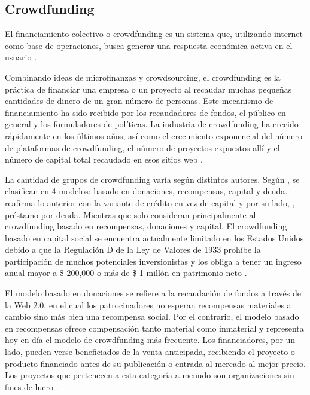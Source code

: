 \subsection{Crowdfunding}
El financiamiento colectivo o crowdfunding es un sistema que, utilizando internet como base de operaciones, busca generar una respuesta económica activa en el usuario \parencite{cr_lopezgolan2017crowdfunding}.

Combinando ideas de microfinanzas y crowdsourcing, el crowdfunding es la práctica de financiar una empresa o un proyecto al recaudar muchas pequeñas cantidades de dinero de un gran número de personas. Este mecanismo de financiamiento ha sido recibido por los recaudadores de fondos, el público en general y los formuladores de políticas. La industria de crowdfunding ha crecido rápidamente en los últimos años, así como el crecimiento exponencial del número de plataformas de crowdfunding, el número de proyectos expuestos allí y el número de capital total recaudado en esos sitios web \parencite{cr_xuefeng2018chcrowdplatf}.

La cantidad de grupos de crowdfunding varía según distintos autores. Según \citeauthor{cr_hollas2013crwd}, se clasifican en 4 modelos: basado en donaciones, recompensas, capital y deuda. \citeauthor{cr_colgren2014risecrwd} reafirma lo anterior con la variante de crédito en vez de capital y por su lado, \citeauthor{cr_collins2014crwd}, préstamo por deuda. Mientras que \citeauthor{cr_lee2018fintech} solo consideran principalmente al crowdfunding basado en recompensas, donaciones y capital. El crowdfunding basado en capital social se encuentra actualmente limitado en los Estados Unidos debido a que la Regulación D de la Ley de Valores de 1933 prohíbe la participación de muchos potenciales inversionistas y los obliga a tener un ingreso anual mayor a \$ 200,000 o más de \$ 1 millón en patrimonio neto \parencite{cr_lichtig2015crowdfunding}.

El modelo basado en donaciones se refiere a la recaudación de fondos a través de la Web 2.0, en el cual los patrocinadores no esperan recompensas materiales a cambio sino más bien una recompensa social. Por el contrario, el modelo basado en recompensas ofrece compensación tanto material como inmaterial y representa hoy en día el modelo de crowdfunding más frecuente. Los financiadores, por un lado, pueden verse beneficiados de la venta anticipada, recibiendo el proyecto o producto financiado antes de su publicación o entrada al mercado al mejor precio. Los proyectos que pertenecen a esta categoría a menudo son organizaciones sin fines de lucro \parencite{cr_kraus2016crowdfunding_strategies}.

